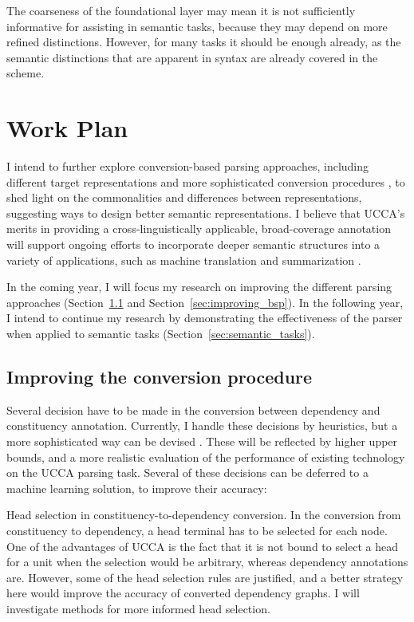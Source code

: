 \documentclass[11pt]{article}
\makeatletter
\newcommand{\secref}[1]{Section~\ref{#1}}
\renewcommand{\paragraph}{
  \@startsection{paragraph}{4}
  {\z@}{.3ex \@plus .3ex \@minus .2ex}{-1em}
  {\normalfont\normalsize\bfseries}
}
\makeatother
\begin{document}
The coarseness of the foundational layer may mean it is not
sufficiently informative for assisting in semantic tasks, because they may
depend on more refined distinctions. However, for many tasks it should be
enough already, as the semantic distinctions that are apparent in syntax are
already covered in the scheme.


\section{Work Plan}\label{sec:plan}

I intend to further explore conversion-based parsing approaches,
including different target representations and more sophisticated conversion
procedures \cite{kong-15},
to shed light on the commonalities and differences between representations,
suggesting ways to design better semantic representations.
I believe that UCCA's merits in providing a cross-linguistically applicable,
broad-coverage annotation will support ongoing efforts to incorporate deeper
semantic structures into a variety of applications, such as machine translation
\cite{jones2012semantics} and summarization \cite{liu2015toward}.

In the coming year, I will focus my research on improving the different parsing approaches
(\secref{sec:improving_conversions} and \secref{sec:improving_bsp}).
In the following year, I intend to continue my research by demonstrating the effectiveness
of the parser when applied to semantic tasks (\secref{sec:semantic_tasks}).


\subsection{Improving the conversion procedure}\label{sec:improving_conversions}
Several decision have to be made in the conversion between dependency and
constituency annotation.
Currently, I handle these decisions by heuristics, but a more
sophisticated way can be devised \cite{fernandez2015parsing}.
These will be reflected by higher upper bounds, and a more realistic evaluation
of the performance of existing technology on the UCCA parsing task.
Several of these decisions can be deferred to a machine learning solution,
to improve their accuracy:

\paragraph{Head selection in constituency-to-dependency conversion.}
In the conversion from constituency to dependency, a head terminal has to be
selected for each node. One of the advantages of UCCA is the fact that it is not bound
to select a head for a unit when the selection would be arbitrary, whereas dependency
annotations are. However, some of the head selection rules are justified, and a
better strategy here would improve the accuracy of converted dependency graphs.
I will investigate methods for more informed head selection.
\end{document}
